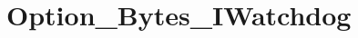 \hypertarget{group___option___bytes___i_watchdog}{\section{Option\-\_\-\-Bytes\-\_\-\-I\-Watchdog}
\label{group___option___bytes___i_watchdog}
}
